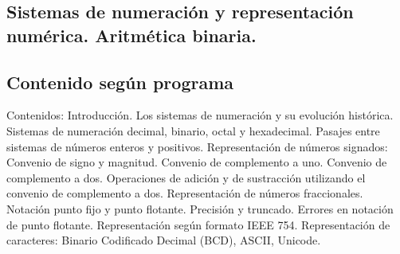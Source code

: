 \setcounter{subsection}{2}
\subsection*{Sistemas de numeración y representación numérica. Aritmética binaria.}
\subsection*{Contenido según programa}
Contenidos: Introducción. Los sistemas de numeración y su evolución histórica.  Sistemas de numeración decimal, binario, octal y hexadecimal. Pasajes entre sistemas de números enteros y positivos. Representación de números signados: Convenio de signo y magnitud. Convenio de complemento a uno. Convenio de complemento a dos. Operaciones de adición y de sustracción utilizando el convenio
de complemento a dos.
Representación de números fraccionales. Notación punto fijo y punto flotante.  Precisión y truncado. Errores en notación de punto flotante. Representación según formato IEEE 754. Representación de caracteres: Binario Codificado Decimal (BCD),
ASCII, Unicode.

